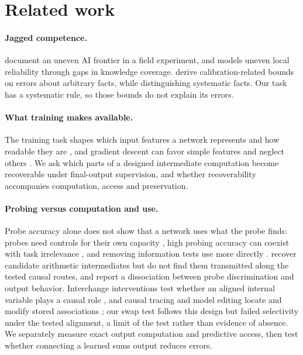 \section{Related work}\label{sec:related}

\paragraph{Jagged competence.} \citet{dellacqua2023} document an uneven AI
frontier in a field experiment, and \citet{gans2026} models uneven local
reliability through gaps in knowledge coverage. \citet{kalai2024} derive
calibration-related bounds on errors about arbitrary facts, while
distinguishing systematic facts. Our task has a systematic rule, so those
bounds do not explain its errors.

\paragraph{What training makes available.} The training task shapes which
input features a network represents and how readable they are
\citep{hermann2020}, and gradient descent can favor simple features and
neglect others \citep{shah2020,pezeshki2021,geirhos2020}. We ask which parts of a designed intermediate computation become
recoverable under final-output supervision, and whether recoverability
accompanies computation, access and preservation.

\paragraph{Probing versus computation and use.} Probe accuracy alone does
not show that a network uses what the probe finds: probes need controls for
their own capacity \citep{hewitt2019,belinkov2022}, high probing accuracy can
coexist with task irrelevance \citep{ravichander2021}, and removing
information tests use more directly \citep{elazar2021}. \citet{darade2026}
recover candidate arithmetic intermediates but do not find them transmitted
along the tested causal routes, and \citet{basu2026} report a dissociation
between probe discrimination and output behavior. Interchange interventions test whether an aligned internal variable plays a
causal role \citep{geiger2021,geiger2024}, and causal tracing and model
editing locate and modify stored associations \citep{meng2022}; our swap test follows
this design but failed selectivity under the tested alignment, a limit of
the test rather than evidence of absence. We separately measure exact output
computation and predictive access, then test whether connecting a learned
sums output reduces errors.

